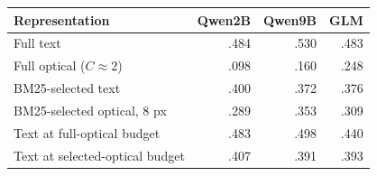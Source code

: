 \begin{tabular}{lrrr}
\toprule
Representation & Qwen2B & Qwen9B & GLM \\
\midrule
Full text & .484 & .530 & .483 \\
Full optical ($C\approx2$) & .098 & .160 & .248 \\
BM25-selected text & .400 & .372 & .376 \\
BM25-selected optical, 8 px & .289 & .353 & .309 \\
Text at full-optical budget & .483 & .498 & .440 \\
Text at selected-optical budget & .407 & .391 & .393 \\
\bottomrule
\end{tabular}
